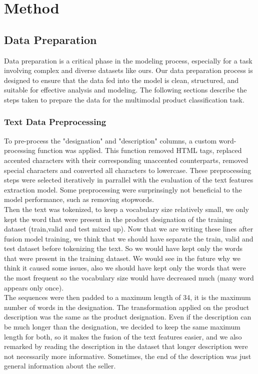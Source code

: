 \chapter{Method}
\label{sec:method}

\section{Data Preparation}
Data preparation is a critical phase in the modeling process, especially for a task involving complex and diverse datasets like ours. Our data preparation process is designed to ensure that the data fed into the model is clean, structured, and suitable for effective analysis and modeling. The following sections describe the steps taken to prepare the data for the multimodal product classification task.

\subsection{Text Data Preprocessing}

To pre-process the "designation" and "description" columns, a custom word-processing function was applied. This function removed HTML tags, replaced accented characters with their corresponding unaccented counterparts, removed special characters and converted all characters to lowercase. These preprocessing steps were selected iteratively in parrallel with the evaluation of the text features extraction model. Some preprocessing were surprinsingly not beneficial to the model performance, such as removing stopwords.\\

Then the text was tokenized, to keep a vocabulary size relatively small, we only kept the word that were present in the product designation of the training dataset (train,valid and test mixed up).
Now that we are writing these lines after fusion model training, we think that we should have separate the train, valid and test dataset before tokenizing the text. So we would have kept only the words that were present in the training dataset. We would see in the future why we think it caused some issues, also we should have kept only the words that were the most frequent so the vocabulary size would have decreased much (many word appears only once).\\

The sequences were then padded to a maximum length of 34, it is the maximum number of words in the designation. The transformation applied on the product description was the same as the product designation. Even if the description can be much longer than the designation, we decided to keep the same maximum length for both, so it makes the fusion of the text features easier, and we also remarked by reading the description in the dataset that longer description were not necessarily more informative. Sometimes, the end of the description was just general information about the seller.\\



